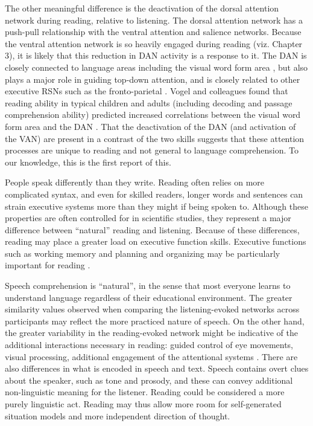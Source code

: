 The other meaningful difference is the deactivation of the dorsal attention network during reading, relative to listening. The dorsal attention network has a push-pull relationship with the ventral attention and salience networks. Because the ventral attention network is so heavily engaged during reading (viz. Chapter 3), it is likely that this reduction in DAN activity is a response to it. The DAN is closely connected to language areas including the visual word form area \citep{Bouhali2014}, but also plays a major role in guiding top-down attention, and is closely related to other executive RSNs such as the fronto-parietal \citep{Vogel2014}. Vogel and colleagues found that reading ability in typical children and adults (including decoding and passage comprehension ability) predicted increased correlations between the visual word form area and the DAN \citep{Vogel2012a}. That the deactivation of the DAN (and activation of the VAN) are present in a contrast of the two skills suggests that these attention processes are unique to reading and not general to language comprehension. To our knowledge, this is the first report of this.

People speak differently than they write. Reading often relies on more complicated syntax, and even for skilled readers, longer words and sentences can strain executive systems more than they might if being spoken to. Although these properties are often controlled for in scientific studies, they represent a major difference between “natural” reading and listening. Because of these differences, reading may place a greater load on executive function skills. Executive functions such as working memory and planning and organizing may be particularly important for reading \citep{Cain2006}.  

Speech comprehension is ``natural'', in the sense that most everyone learns to understand language regardless of their educational environment. The greater similarity values observed when comparing the listening-evoked networks across participants may reflect the more practiced nature of speech. On the other hand, the greater variability in the reading-evoked network might be indicative of the additional interactions necessary in reading: guided control of eye movements, visual processing, additional engagement of the attentional systems \citep{Mattingly1972}. There are also differences in what is encoded in speech and text.  Speech contains overt clues about the speaker, such as tone and prosody, and these can convey additional non-linguistic meaning for the listener. Reading could be considered a more purely linguistic act. Reading may thus allow more room for self-generated situation models and more independent direction of thought. 

